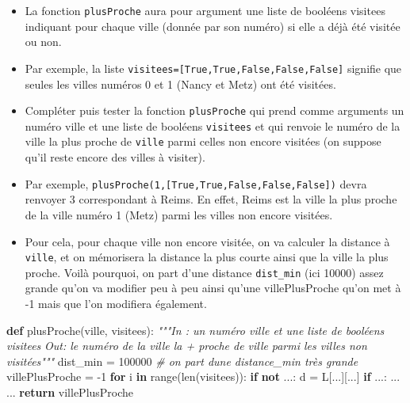 \documentclass[
  paper=a4,
  ,captions=tableheading
]{scrartcl}
\newenvironment{Shaded}{}{}
\newcommand{\BuiltInTok}[1]{\textcolor[rgb]{0.00,0.50,0.00}{#1}}
\newcommand{\CommentTok}[1]{\textcolor[rgb]{0.38,0.63,0.69}{\textit{#1}}}
\newcommand{\ControlFlowTok}[1]{\textcolor[rgb]{0.00,0.44,0.13}{\textbf{#1}}}
\newcommand{\DecValTok}[1]{\textcolor[rgb]{0.25,0.63,0.44}{#1}}
\newcommand{\KeywordTok}[1]{\textcolor[rgb]{0.00,0.44,0.13}{\textbf{#1}}}
\newcommand{\NormalTok}[1]{#1}
\newcommand{\OperatorTok}[1]{\textcolor[rgb]{0.40,0.40,0.40}{#1}}
\begin{document}
\begin{itemize}
\item
  La fonction \texttt{plusProche} aura pour argument une liste de
  booléens visitees indiquant pour chaque ville (donnée par son numéro)
  si elle a déjà été visitée ou non.
\item
  Par exemple, la liste
  \texttt{visitees={[}True,True,False,False,False{]}} signifie que
  seules les villes numéros 0 et 1 (Nancy et Metz) ont été visitées.
\item
  Compléter puis tester la fonction \texttt{plusProche} qui prend comme
  arguments un numéro ville et une liste de booléens \texttt{visitees}
  et qui renvoie le numéro de la ville la plus proche de \texttt{ville}
  parmi celles non encore visitées (on suppose qu'il reste encore des
  villes à visiter).
\item
  Par exemple, \texttt{plusProche(1,{[}True,True,False,False,False{]})}
  devra renvoyer 3 correspondant à Reims. En effet, Reims est la ville
  la plus proche de la ville numéro 1 (Metz) parmi les villes non encore
  visitées.
\item
  Pour cela, pour chaque ville non encore visitée, on va calculer la
  distance à \texttt{ville}, et on mémorisera la distance la plus courte
  ainsi que la ville la plus proche. Voilà pourquoi, on part d'une
  distance \texttt{dist\_min} (ici 10000) assez grande qu'on va modifier
  peu à peu ainsi qu'une villePlusProche qu'on met à -1 mais que l'on
  modifiera également.
\end{itemize}

\begin{Shaded}
\begin{Highlighting}[]
\KeywordTok{def}\NormalTok{ plusProche(ville, visitees):}
    \CommentTok{"""In : un numéro ville et une liste de booléens visitees}
\CommentTok{    Out: le numéro de la ville la + proche de ville}
\CommentTok{         parmi les villes non visitées"""}
\NormalTok{    dist\_min }\OperatorTok{=} \DecValTok{100000}  \CommentTok{\# on part d\textquotesingle{}une distance\_min très grande}
\NormalTok{    villePlusProche }\OperatorTok{=} \OperatorTok{{-}}\DecValTok{1}
    \ControlFlowTok{for}\NormalTok{ i }\KeywordTok{in} \BuiltInTok{range}\NormalTok{(}\BuiltInTok{len}\NormalTok{(visitees)):}
        \ControlFlowTok{if} \KeywordTok{not}\NormalTok{ ...:}
\NormalTok{            d }\OperatorTok{=}\NormalTok{ L[...][...]}
            \ControlFlowTok{if}\NormalTok{ ...:}
\NormalTok{                ...}
\NormalTok{                ...}
    \ControlFlowTok{return}\NormalTok{ villePlusProche}
\end{Highlighting}
\end{Shaded}
\end{document}
